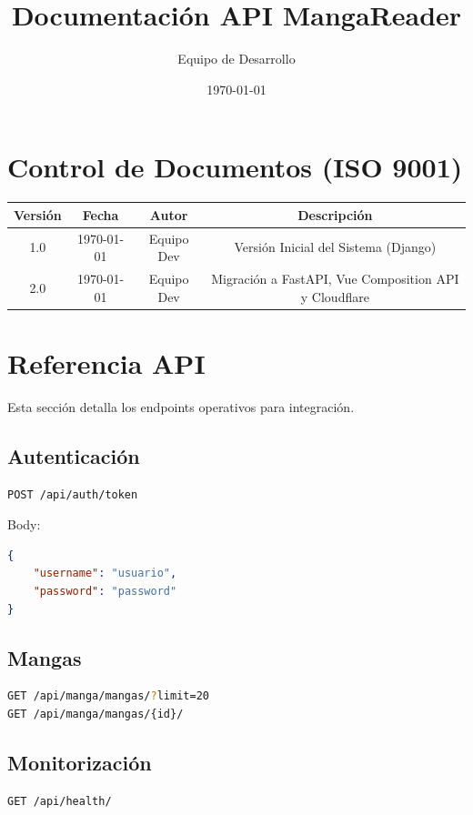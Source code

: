 \documentclass[12pt,a4paper]{article}
\title{Documentación API MangaReader}
\author{Equipo de Desarrollo}
\date{\today}
\begin{document}
\maketitle

\section*{Control de Documentos (ISO 9001)}
\begin{center}
\begin{tabular}{|c|c|c|c|}
    \hline
    \textbf{Versión} & \textbf{Fecha} & \textbf{Autor} & \textbf{Descripción} \\
    \hline
    \hline
    1.0 & \today & Equipo Dev & Versión Inicial del Sistema (Django) \\
    \hline
    2.0 & \today & Equipo Dev & Migración a FastAPI, Vue Composition API y Cloudflare \\
\end{tabular}
\end{center}

\tableofcontents
\newpage






\section{Referencia API}
Esta sección detalla los endpoints operativos para integración.

\subsection{Autenticación}
\begin{lstlisting}[language=bash]
POST /api/auth/token
\end{lstlisting}
Body:
\begin{lstlisting}[language=json]
{
    "username": "usuario",
    "password": "password"
}
\end{lstlisting}

\subsection{Mangas}
\begin{lstlisting}[language=bash]
GET /api/manga/mangas/?limit=20
GET /api/manga/mangas/{id}/
\end{lstlisting}

\subsection{Monitorización}
\begin{lstlisting}[language=bash]
GET /api/health/
\end{lstlisting}
\end{document}
